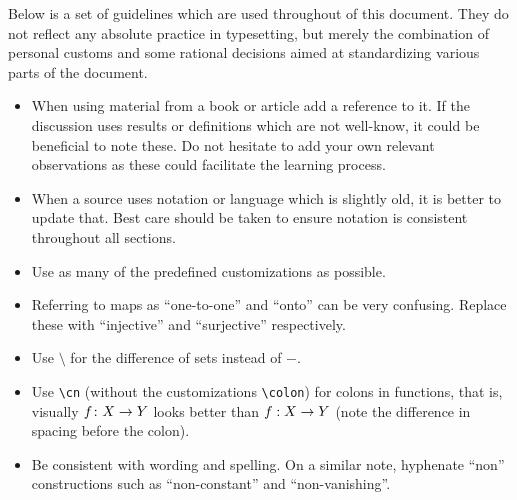 Below is a set of guidelines which are used throughout of this document. They do not reflect any absolute practice in typesetting, but merely the combination of personal customs and some rational decisions aimed at standardizing various parts of the document.
\begin{itemize}
\item
  When using material from a book or article add a reference to it. If the discussion uses results or definitions which are not well-know, it could be beneficial to note these. Do not hesitate to add your own relevant observations as these could facilitate the learning process.
\item
  When a source uses notation or language which is slightly old, it is better to update that. Best care should be taken to ensure notation is consistent throughout all sections.
\item
  Use as many of the predefined customizations as possible.
\item
  Referring to maps as ``one-to-one'' and ``onto'' can be very confusing. Replace these with ``injective'' and ``surjective'' respectively.
\item Use $\setminus$ for the difference of sets instead of $-$.
\item Use \texttt{\textbackslash cn} (without the customizations \texttt{\textbackslash colon}) for colons in functions, that is, visually $f \cn X \rarr Y$ looks better than $f : X \rarr Y$ (note the difference in spacing before the colon).
\item Be consistent with wording and spelling. On a similar note, hyphenate ``non'' constructions such as ``non-constant'' and ``non-vanishing''.
\end{itemize}


